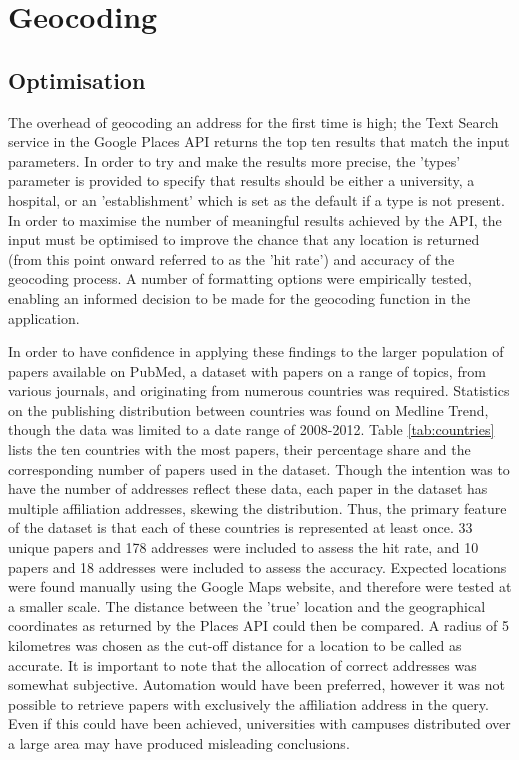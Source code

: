 \documentclass[Report.tex]{subfiles}
\begin{document}
\section{Geocoding}
\subsection{Optimisation}
The overhead of geocoding an address for the first time is high; the Text Search service in the Google Places API returns the top ten results that match the input parameters. In order to try and make the results more precise, the 'types' parameter is provided to specify that results should be either a university, a hospital, or an 'establishment' which is set as the default if a type is not present. In order to maximise the number of meaningful results achieved by the API, the input must be optimised to improve the chance that any location is returned (from this point onward referred to as the 'hit rate') and accuracy of the geocoding process. A number of formatting options were empirically tested, enabling an informed decision to be made for the geocoding function in the application.\newline

\noindent In order to have confidence in applying these findings to the larger population of papers available on PubMed, a dataset with papers on a range of topics, from various journals, and originating from numerous countries was required. Statistics on the publishing distribution between countries was found on Medline Trend\cite{medlinetrend}, though the data was limited to a date range of 2008-2012. Table \ref{tab:countries} lists the ten countries with the most papers, their percentage share and the corresponding number of papers used in the dataset. Though the intention was to have the number of addresses reflect these data, each paper in the dataset has multiple affiliation addresses, skewing the distribution. Thus, the primary feature of the dataset is that each of these countries is represented at least once. 33 unique papers and 178 addresses were included to assess the hit rate, and 10 papers and 18 addresses were included to assess the accuracy. Expected locations were found manually using the Google Maps website, and therefore were tested at a smaller scale. The distance between the 'true' location and the geographical coordinates as returned by the Places API could then be compared. A radius of 5 kilometres was chosen as the cut-off distance for a location to be called as accurate. It is important to note that the allocation of correct addresses was somewhat subjective. Automation would have been preferred, however it was not possible to retrieve papers with exclusively the affiliation address in the query. Even if this could have been achieved, universities with campuses distributed over a large area may have produced misleading conclusions.\newpage
\end{document}
